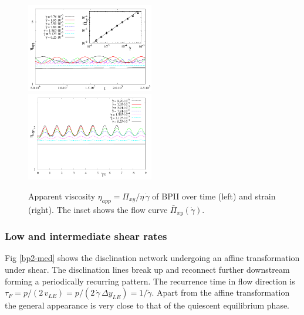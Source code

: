 \documentclass[aps,pre,reprint,superscriptaddress, twocolumn]{revtex4}
\newcommand{\gd}{\dot{\gamma}}
\begin{document}
\begin{figure}[ht!]
\includegraphics[width=0.495\textwidth]{stress_bp2.pdf}
\includegraphics[width=0.495\textwidth]{stress_vs_strain_bp2.pdf}
\caption{Apparent viscosity $\eta_{app}=\Pi_{xy}/\eta\,\gd$ of BPII over time (left) and strain (right). The inset shows the flow curve $\bar{\Pi}_{xy}(\gd)$.}
\label{bp2-rheo}
\end{figure}


\subsubsection{Low and intermediate shear rates}

Fig \ref{bp2-med} shows the disclination network 
undergoing an affine transformation under shear. The disclination lines break up and 
reconnect further downstream forming a periodically recurring pattern. 
The recurrence time in flow direction is $\tau_F=p/(2\, v_{LE})=p/(2\,\gd\, \Delta y_{LE})= 1/\gd$.
Apart from the affine transformation the general appearance is very close to that 
of the quiescent equilibrium phase.
\end{document}
